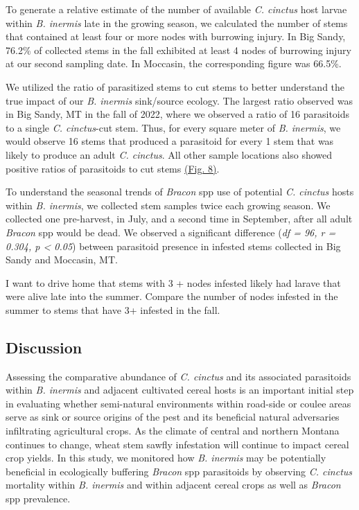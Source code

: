 \documentclass[
]{article}
\begin{document}
To generate a relative estimate of the number of available \emph{C.
cinctus} host larvae within \emph{B. inermis} late in the growing
season, we calculated the number of stems that contained at least four
or more nodes with burrowing injury. In Big Sandy, 76.2\% of collected
stems in the fall exhibited at least 4 nodes of burrowing injury at our
second sampling date. In Moccasin, the corresponding figure was 66.5\%.

We utilized the ratio of parasitized stems to cut stems to better
understand the true impact of our \emph{B. inermis} sink/source ecology.
The largest ratio observed was in Big Sandy, MT in the fall of 2022,
where we observed a ratio of 16 parasitoids to a single \emph{C.
cinctus}-cut stem. Thus, for every square meter of \emph{B. inermis}, we
would observe 16 stems that produced a parasitoid for every 1 stem that
was likely to produce an adult \emph{C. cinctus}. All other sample
locations also showed positive ratios of parasitoids to cut stems
\hyperref[figure8]{(Fig. 8)}.

To understand the seasonal trends of \emph{Bracon} spp use of potential
\emph{C. cinctus} hosts within \emph{B. inermis}, we collected stem
samples twice each growing season. We collected one pre-harvest, in
July, and a second time in September, after all adult \emph{Bracon} spp
would be dead. We observed a significant difference (\emph{df = 96, r =
0.304, p \textless{} 0.05}) between parasitoid presence in infested
stems collected in Big Sandy and Moccasin, MT.

I want to drive home that stems with 3 + nodes infested likely had
larave that were alive late into the summer. Compare the number of nodes
infested in the summer to stems that have 3+ infested in the fall.

\subsection{Discussion}\label{discussion}

Assessing the comparative abundance of \emph{C. cinctus} and its
associated parasitoids within \emph{B. inermis} and adjacent cultivated
cereal hosts is an important initial step in evaluating whether
semi-natural environments within road-side or coulee areas serve as sink
or source origins of the pest and its beneficial natural adversaries
infiltrating agricultural crops. As the climate of central and northern
Montana continues to change, wheat stem sawfly infestation will continue
to impact cereal crop yields. In this study, we monitored how \emph{B.
inermis} may be potentially beneficial in ecologically buffering
\emph{Bracon} spp parasitoids by observing \emph{C. cinctus} mortality
within \emph{B. inermis} and within adjacent cereal crops as well as
\emph{Bracon} spp prevalence.
\end{document}
